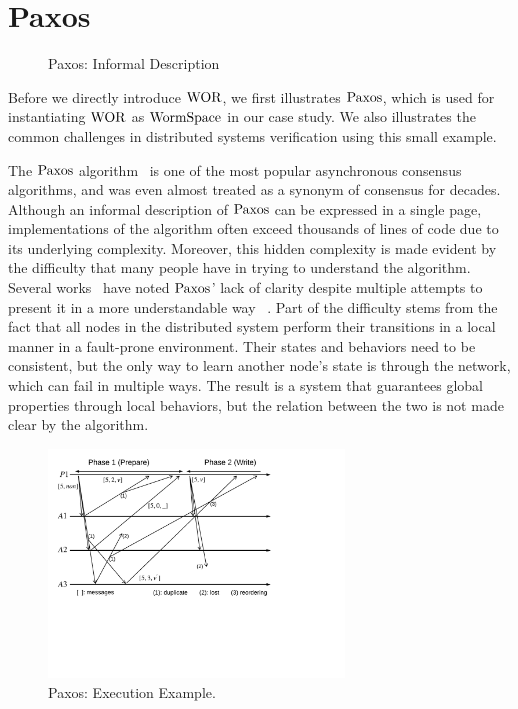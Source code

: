 \section{Paxos} 
\label{sec:paxos} 

\begin{figure}
\begin{minipage}{\linewidth}
\begin{multicols}{2}

\end{multicols}
\end{minipage}
\caption{Paxos: Informal Description}
\label{fig:chapter:multipaxos:paxos-pseudocode}
\end{figure}

Before we directly introduce $\mathrm{WOR}$,
we first illustrates $\mathrm{Paxos}$, which is used for instantiating $\mathrm{WOR}$ as $\mathrm{WormSpace}$ in our case study.
We also illustrates the common challenges in distributed systems verification using this small example.

The $\mathrm{Paxos}$ algorithm~\cite{paxos}
is  one of the most popular asynchronous consensus algorithms, and was even almost treated as a synonym of
consensus for decades.
Although an informal description of $\mathrm{Paxos}$ can be expressed in a single page,
implementations of the algorithm often exceed thousands of lines of code due to its underlying complexity.
Moreover, this hidden complexity is made evident by the difficulty that many people have in trying to understand the algorithm.
Several works~\cite{raft, rvrpaxos} have noted $\mathrm{Paxos}$' lack of clarity despite multiple attempts to present
it in a more understandable way ~\cite{paxosmadesimple, Lampson1996, Lampson2001, dpaxos}.
Part of the difficulty stems from the fact that all nodes in the distributed system perform their transitions in a local manner in a fault-prone environment.
Their states and behaviors need to be consistent, but
the only way to learn another node's state is through the network, which can fail in multiple ways.
The result is a system that guarantees global properties through local behaviors, but the relation between the two is not made clear by the algorithm.

\begin{figure}
\begin{center}
\includegraphics[width=0.7\textwidth]{figs/multipaxos/paxos_example_nowitness}
\end{center}
\caption{Paxos: Execution Example.}
\label{fig:chapter:multipaxos:paxos-example}
\end{figure}

